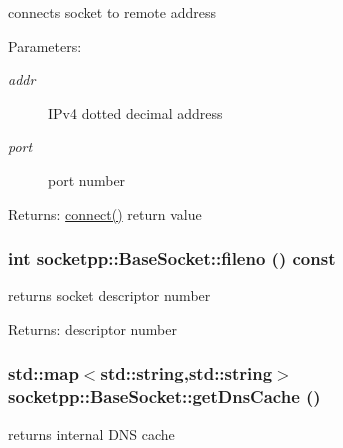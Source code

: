 connects socket to remote address 

\begin{Desc}
\item[Parameters:]
\begin{description}
\item[{\em addr}]IPv4 dotted decimal address \item[{\em port}]port number \end{description}
\end{Desc}
\begin{Desc}
\item[Returns:]\hyperlink{classsocketpp_1_1BaseSocket_769710192256606aaec1a776468d75fa}{connect()} return value \end{Desc}
\hypertarget{classsocketpp_1_1BaseSocket_c96db07cc917926d895d89cf73734ea1}{
\subsubsection[{fileno}]{\setlength{\rightskip}{0pt plus 5cm}int socketpp::BaseSocket::fileno () const}}
\label{classsocketpp_1_1BaseSocket_c96db07cc917926d895d89cf73734ea1}


returns socket descriptor number 

\begin{Desc}
\item[Returns:]descriptor number \end{Desc}
\hypertarget{classsocketpp_1_1BaseSocket_52bf8df48bf4da48eff4adc690caa211}{
\subsubsection[{getDnsCache}]{\setlength{\rightskip}{0pt plus 5cm}std::map$<$std::string,std::string$>$ socketpp::BaseSocket::getDnsCache ()}}
\label{classsocketpp_1_1BaseSocket_52bf8df48bf4da48eff4adc690caa211}


returns internal DNS cache 

